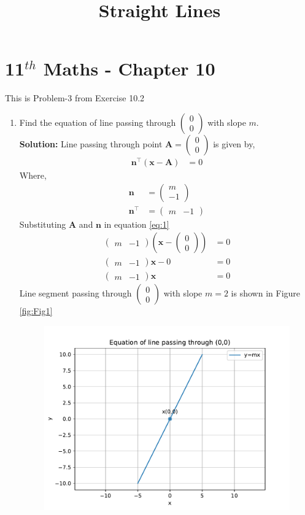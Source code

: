 \documentclass[12pt]{article}
\providecommand{\brak}[1]{\ensuremath{\left(#1\right)}}
\newcommand{\solution}{\noindent \textbf{Solution: }}
\newcommand{\myvec}[1]{\ensuremath{\begin{pmatrix}#1\end{pmatrix}}}
\let\vec\mathbf
\begin{document}
\begin{center}
\title{\textbf{Straight Lines}}
\date{\vspace{-5ex}} %
\maketitle
\end{center}
\setcounter{page}{1}
\section*{11$^{th}$ Maths - Chapter 10}
This is Problem-3 from Exercise 10.2
\begin{enumerate}
	\item Find the equation of line passing through $\myvec{0\\0}$ with slope $m$.\\
\solution
		Line passing through point $\vec{A}=\myvec{0\\0}$ is given by,
\begin{align}
	\vec{n}^\top \brak{\vec{x}-\vec{A}} &= 0\label{eq:1}
\end{align}
Where,
		\begin{align}
			\vec{n} &=\myvec{m \\ -1}\\
			\vec{n}^\top &=\myvec{m & -1}
		\end{align}
		Substituting $\vec{A}$ and $\vec{n}$ in equation \eqref{eq:1}
		\begin{align}
			\myvec{m & -1}\brak{\vec{x}-\myvec{0\\0}} &=0\\
			\myvec{m & -1}\vec{x}-0 &=0\\
			\myvec{m & -1}\vec{x} &= 0
		\end{align}
Line segment passing through $\myvec{0\\0}$ with slope $m = 2$ is shown in Figure \eqref{fig:Fig1}
\begin{figure}[!h]
\begin{center}
\includegraphics[width=\columnwidth]{figs/fig.pdf}
\end{center}
\caption{}
\label{fig:Fig1}
\end{figure}
\end{enumerate}
\end{document}

